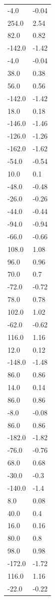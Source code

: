 \begin{longtable}{ll}
-4.0 & -0.04 \\
254.0 & 2.54 \\
82.0 & 0.82 \\
-142.0 & -1.42 \\
-4.0 & -0.04 \\
38.0 & 0.38 \\
56.0 & 0.56 \\
-142.0 & -1.42 \\
18.0 & 0.18 \\
-146.0 & -1.46 \\
-126.0 & -1.26 \\
-162.0 & -1.62 \\
-54.0 & -0.54 \\
10.0 & 0.1 \\
-48.0 & -0.48 \\
-26.0 & -0.26 \\
-44.0 & -0.44 \\
-94.0 & -0.94 \\
-66.0 & -0.66 \\
108.0 & 1.08 \\
96.0 & 0.96 \\
70.0 & 0.7 \\
-72.0 & -0.72 \\
78.0 & 0.78 \\
102.0 & 1.02 \\
-62.0 & -0.62 \\
116.0 & 1.16 \\
12.0 & 0.12 \\
-148.0 & -1.48 \\
86.0 & 0.86 \\
14.0 & 0.14 \\
86.0 & 0.86 \\
-8.0 & -0.08 \\
86.0 & 0.86 \\
-182.0 & -1.82 \\
-76.0 & -0.76 \\
68.0 & 0.68 \\
-30.0 & -0.3 \\
-140.0 & -1.4 \\
8.0 & 0.08 \\
40.0 & 0.4 \\
16.0 & 0.16 \\
80.0 & 0.8 \\
98.0 & 0.98 \\
-172.0 & -1.72 \\
116.0 & 1.16 \\
-22.0 & -0.22 \\

\end{longtable}
